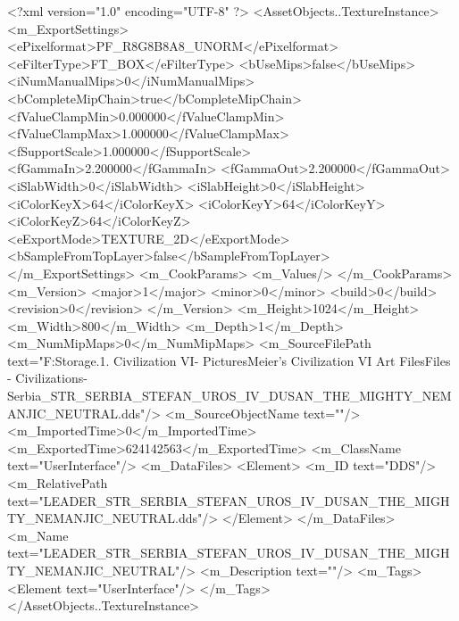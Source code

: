 <?xml version="1.0" encoding="UTF-8" ?>
<AssetObjects..TextureInstance>
	<m_ExportSettings>
		<ePixelformat>PF_R8G8B8A8_UNORM</ePixelformat>
		<eFilterType>FT_BOX</eFilterType>
		<bUseMips>false</bUseMips>
		<iNumManualMips>0</iNumManualMips>
		<bCompleteMipChain>true</bCompleteMipChain>
		<fValueClampMin>0.000000</fValueClampMin>
		<fValueClampMax>1.000000</fValueClampMax>
		<fSupportScale>1.000000</fSupportScale>
		<fGammaIn>2.200000</fGammaIn>
		<fGammaOut>2.200000</fGammaOut>
		<iSlabWidth>0</iSlabWidth>
		<iSlabHeight>0</iSlabHeight>
		<iColorKeyX>64</iColorKeyX>
		<iColorKeyY>64</iColorKeyY>
		<iColorKeyZ>64</iColorKeyZ>
		<eExportMode>TEXTURE_2D</eExportMode>
		<bSampleFromTopLayer>false</bSampleFromTopLayer>
	</m_ExportSettings>
	<m_CookParams>
		<m_Values/>
	</m_CookParams>
	<m_Version>
		<major>1</major>
		<minor>0</minor>
		<build>0</build>
		<revision>0</revision>
	</m_Version>
	<m_Height>1024</m_Height>
	<m_Width>800</m_Width>
	<m_Depth>1</m_Depth>
	<m_NumMipMaps>0</m_NumMipMaps>
	<m_SourceFilePath text="F:\Mod Storage\2.1. Civilization VI\Mods\Archive - Pictures\Sid Meier's Civilization VI Art Files\Art Files - Civilizations\Civilization - Serbia\LEADER_STR_SERBIA_STEFAN_UROS_IV_DUSAN_THE_MIGHTY_NEMANJIC_NEUTRAL.dds"/>
	<m_SourceObjectName text=""/>
	<m_ImportedTime>0</m_ImportedTime>
	<m_ExportedTime>624142563</m_ExportedTime>
	<m_ClassName text="UserInterface"/>
	<m_DataFiles>
		<Element>
			<m_ID text="DDS"/>
			<m_RelativePath text="LEADER_STR_SERBIA_STEFAN_UROS_IV_DUSAN_THE_MIGHTY_NEMANJIC_NEUTRAL.dds"/>
		</Element>
	</m_DataFiles>
	<m_Name text="LEADER_STR_SERBIA_STEFAN_UROS_IV_DUSAN_THE_MIGHTY_NEMANJIC_NEUTRAL"/>
	<m_Description text=""/>
	<m_Tags>
		<Element text="UserInterface"/>
	</m_Tags>
</AssetObjects..TextureInstance>

